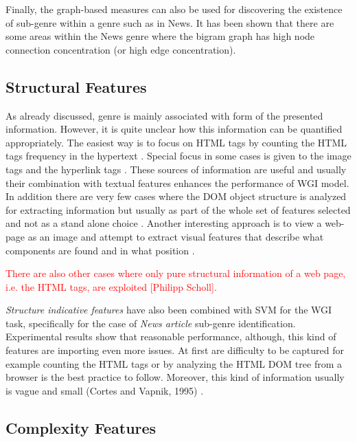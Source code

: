 Finally, the graph-based measures can also be used for discovering the existence of sub-genre within a genre such as in News. It has been shown that there are some areas within the News genre where the bigram graph has high node connection concentration (or high edge concentration).  

\subsection{Structural Features}

As already discussed, genre is mainly associated with form of the presented information. However, it is quite unclear how this information can be quantified appropriately. The easiest way is to focus on HTML tags by counting the HTML tags frequency in the hypertext . Special focus in some cases is given to the image tags and the hyperlink tags \parencite{Lim2005,levering2008using}. These sources of information are useful and usually their combination with textual features enhances the performance of
WGI model. In addition there are very few cases where the DOM object structure is analyzed for extracting information but usually as part of the whole set of features selected and not as a stand alone choice \parencite{mehler2011integrating}. Another interesting approach is to view a web-page as an image and attempt to extract visual features that describe what components are found and in what position .

\textcolor{red}{There are also other cases where only pure structural information of a web page, i.e. the HTML tags, are exploited {[}Philipp Scholl{]}.} 

\textit{Structure indicative features} have also been combined with SVM for the WGI task, specifically for the case of \textit{News article} sub-genre identification. Experimental results show that reasonable performance, although, this kind of features are importing even more issues. At first are difficulty to be captured for example counting the HTML tags or by analyzing the HTML DOM tree from a browser is the best practice to follow. Moreover, this kind of information usually is vague and small (Cortes and Vapnik, 1995) .


\subsection{Complexity Features}

